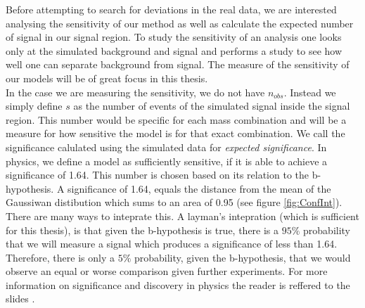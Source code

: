 Before attempting to search for deviations in the real data, we are interested analysing the sensitivity of our method as well 
as calculate the expected number of signal in our signal region. To study the sensitivity of an analysis one looks only at the 
simulated background and signal and performs a study to see how well one can separate background from signal. The measure of the sensitivity 
of our models will be of great focus in this thesis.
\\
In the case we are measuring the sensitivity, we do not have $n_{obs}$. Instead we simply define $s$ as the number of events of the simulated signal 
inside the signal region. This number would be specific for each mass combination and will be a measure for how sensitive 
the model is for that exact combination. We call the significance calulated using the simulated data for \emph{expected significance}. 
In physics, we define a model as sufficiently sensitive, if it is able to achieve a significance of 1.64. This number is chosen based on 
its relation to the b-hypothesis. A significance of 1.64, equals the distance from the mean of the Gaussiwan distibution which sums to an area of 
0.95 (see figure \ref{fig:ConfInt}). There are many ways to inteprate this. A layman's intepration (which is sufficient for this thesis), is 
that given the b-hypothesis is true, there is a $95\%$ probability that we will measure a signal which produces a significance of less than 
1.64. Therefore, there is only a $5\%$ probability, given the b-hypothesis, that we would observe an equal or worse comparison given further experiments. 
For more information on significance and discovery in physics the reader is reffered to the slides \cite{magnar}.